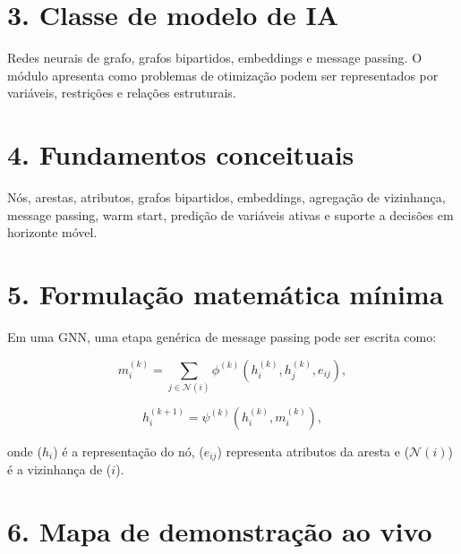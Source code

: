 \documentclass[
  brazilian,
  a4paper,
  DIV=11,
  numbers=noendperiod]{scrreprt}
\begin{document}
\section{3. Classe de modelo de IA}\label{classe-de-modelo-de-ia-2}

Redes neurais de grafo, grafos bipartidos, embeddings e message passing.
O módulo apresenta como problemas de otimização podem ser representados
por variáveis, restrições e relações estruturais.

\section{4. Fundamentos conceituais}\label{fundamentos-conceituais-2}

Nós, arestas, atributos, grafos bipartidos, embeddings, agregação de
vizinhança, message passing, warm start, predição de variáveis ativas e
suporte a decisões em horizonte móvel.

\section{5. Formulação matemática
mínima}\label{formulauxe7uxe3o-matemuxe1tica-muxednima-2}

Em uma GNN, uma etapa genérica de message passing pode ser escrita como:

\[
m_i^{(k)} = \sum_{j \in \mathcal{N}(i)}
\phi^{(k)}(h_i^{(k)}, h_j^{(k)}, e_{ij}),
\]

\[
h_i^{(k+1)} =
\psi^{(k)}(h_i^{(k)}, m_i^{(k)}),
\]

onde (\(h_i\)) é a representação do nó, (\(e_{ij}\)) representa
atributos da aresta e (\(\mathcal{N}(i)\)) é a vizinhança de (\(i\)).

\section{6. Mapa de demonstração ao
vivo}\label{mapa-de-demonstrauxe7uxe3o-ao-vivo-2}
\end{document}
